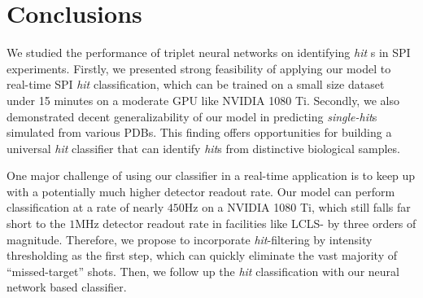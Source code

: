 

















\newcommand{\RN}[1]{%
  \textup{\uppercase\expandafter{\romannumeral#1}}%
}

\section{Conclusions}

We studied the performance of triplet neural networks on identifying \textit{hit}
s in SPI experiments.  Firstly, we presented strong feasibility of applying our
model to real-time SPI \textit{hit} classification, which can be trained on a
small size dataset under 15 minutes on a moderate GPU like NVIDIA 1080 Ti.
Secondly, we also demonstrated decent generalizability of our model in
predicting \textit{single-hit}s simulated from various PDBs.  This finding
offers opportunities for building a universal \textit{hit} classifier that can
identify \textit{hit}s from distinctive biological samples.  

One major challenge of using our classifier in a real-time application is to
keep up with a potentially much higher detector readout rate.  Our model can
perform classification at a rate of nearly $450 \text{Hz}$ on a NVIDIA 1080 Ti,
which still falls far short to the $1 \text{MHz}$ detector readout rate in
facilities like LCLS-\RN{2} by three orders of magnitude.  Therefore, we propose
to incorporate \textit{hit}-filtering by intensity thresholding as the first
step, which can quickly eliminate the vast majority of ``missed-target'' shots.
Then, we follow up the \textit{hit} classification with our neural network based
classifier.  
